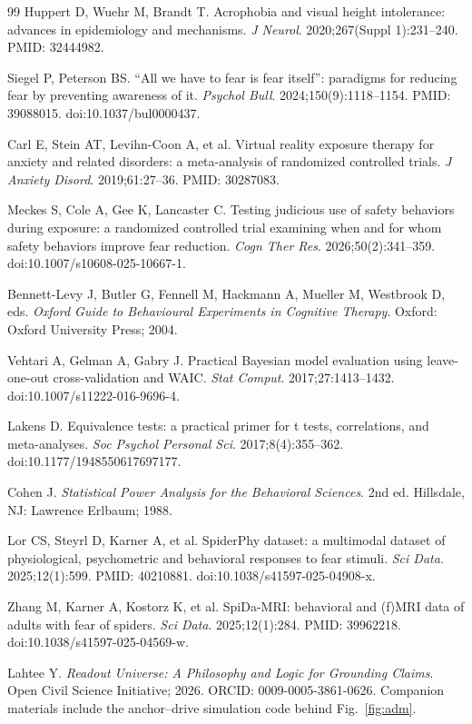 \documentclass[9pt,twocolumn]{article}
\begin{document}
\begin{thebibliography}{99}
Huppert D, Wuehr M, Brandt T. Acrophobia and visual height intolerance: advances in epidemiology and mechanisms. \emph{J Neurol}. 2020;267(Suppl 1):231--240. PMID: 32444982.

Siegel P, Peterson BS. ``All we have to fear is fear itself'': paradigms for reducing fear by preventing awareness of it. \emph{Psychol Bull}. 2024;150(9):1118--1154. PMID: 39088015. doi:10.1037/bul0000437.

Carl E, Stein AT, Levihn-Coon A, et al. Virtual reality exposure therapy for anxiety and related disorders: a meta-analysis of randomized controlled trials. \emph{J Anxiety Disord}. 2019;61:27--36. PMID: 30287083.

Meckes S, Cole A, Gee K, Lancaster C. Testing judicious use of safety behaviors during exposure: a randomized controlled trial examining when and for whom safety behaviors improve fear reduction. \emph{Cogn Ther Res}. 2026;50(2):341--359. doi:10.1007/s10608-025-10667-1.

Bennett-Levy J, Butler G, Fennell M, Hackmann A, Mueller M, Westbrook D, eds. \emph{Oxford Guide to Behavioural Experiments in Cognitive Therapy}. Oxford: Oxford University Press; 2004.

Vehtari A, Gelman A, Gabry J. Practical Bayesian model evaluation using leave-one-out cross-validation and WAIC. \emph{Stat Comput}. 2017;27:1413--1432. doi:10.1007/s11222-016-9696-4.

Lakens D. Equivalence tests: a practical primer for t tests, correlations, and meta-analyses. \emph{Soc Psychol Personal Sci}. 2017;8(4):355--362. doi:10.1177/1948550617697177.

Cohen J. \emph{Statistical Power Analysis for the Behavioral Sciences}. 2nd ed. Hillsdale, NJ: Lawrence Erlbaum; 1988.

Lor CS, Steyrl D, Karner A, et al. SpiderPhy dataset: a multimodal dataset of physiological, psychometric and behavioral responses to fear stimuli. \emph{Sci Data}. 2025;12(1):599. PMID: 40210881. doi:10.1038/s41597-025-04908-x.

Zhang M, Karner A, Kostorz K, et al. SpiDa-MRI: behavioral and (f)MRI data of adults with fear of spiders. \emph{Sci Data}. 2025;12(1):284. PMID: 39962218. doi:10.1038/s41597-025-04569-w.

Lahtee Y. \emph{Readout Universe: A Philosophy and Logic for Grounding Claims}. Open Civil Science Initiative; 2026. ORCID: 0009-0005-3861-0626. Companion materials include the anchor--drive simulation code behind Fig.~\ref{fig:adm}.


\end{thebibliography}
\end{document}
